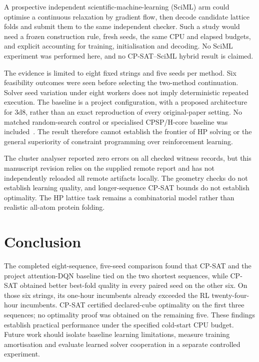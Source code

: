 \documentclass{article}
\theoremstyle{plain}
\theoremstyle{definition}
\begin{document}
A prospective independent scientific-machine-learning (SciML) arm could optimise a continuous relaxation by gradient flow, then decode candidate lattice folds and submit them to the same independent checker. Such a study would need a frozen construction rule, fresh seeds, the same CPU and elapsed budgets, and explicit accounting for training, initialisation and decoding. No SciML experiment was performed here, and no CP-SAT--SciML hybrid result is claimed.

The evidence is limited to eight fixed strings and five seeds per method. Six feasibility outcomes were seen before selecting the two-method continuation. Solver seed variation under eight workers does not imply deterministic repeated execution. The baseline is a project configuration, with a proposed architecture for 3d8, rather than an exact reproduction of every original-paper setting. No matched random-search control or specialised CPSP/H-core baseline was included~\cite{CPSP2009}. The result therefore cannot establish the frontier of HP solving or the general superiority of constraint programming over reinforcement learning.

The cluster analyser reported zero errors on all checked witness records, but this manuscript revision relies on the supplied remote report and has not independently reloaded all remote artifacts locally. The geometry checks do not establish learning quality, and longer-sequence CP-SAT bounds do not establish optimality. The HP lattice task remains a combinatorial model rather than realistic all-atom protein folding.

\section{Conclusion}
The completed eight-sequence, five-seed comparison found that CP-SAT and the project attention-DQN baseline tied on the two shortest sequences, while CP-SAT obtained better best-fold quality in every paired seed on the other six. On those six strings, its one-hour incumbents already exceeded the RL twenty-four-hour incumbents. CP-SAT certified declared-cube optimality on the first three sequences; no optimality proof was obtained on the remaining five. These findings establish practical performance under the specified cold-start CPU budget. Future work should isolate baseline learning limitations, measure training amortisation and evaluate learned solver cooperation in a separate controlled experiment.
\end{document}
